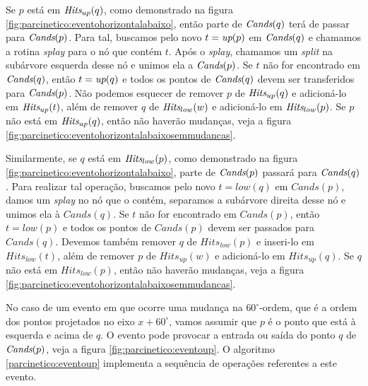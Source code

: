 

Se $p$ está em $\textit{Hits}_{up}(q)$, como demonstrado na figura
\ref{fig:parcinetico:eventohorizontalabaixo}, então parte de
$\textit{Cands}(q)$ terá de passar para $\textit{Cands}(p)$. Para tal, buscamos pelo
novo $t = \textit{up}(p)$ em $\textit{Cands}(q)$ e chamamos a rotina \textit{splay}
para o nó que contém $t$. Após o \textit{splay}, chamamos um
\textit{split} na subárvore esquerda desse nó e unimos ela a
$\textit{Cands}(p)$. Se $t$ não for encontrado em $\textit{Cands}(q)$, então $t =
\textit{up}(q)$ e todos os pontos de $\textit{Cands}(q)$ devem ser transferidos para
$\textit{Cands}(p)$. Não podemos esquecer de remover $p$ de $\textit{Hits}_{up}(q)$
e adicioná-lo em $\textit{Hits}_{up}(t)$, além de remover $q$ de
$\textit{Hits}_{low}(w)$ e adicioná-lo em $\textit{Hits}_{low}(p)$. Se $p$ não está
em $\textit{Hits}_{up}(q)$, então não haverão mudanças, veja a figura
\ref{fig:parcinetico:eventohorizontalabaixosemmudancas}.



Similarmente, se $q$ está em $\textit{Hits}_{low}(p)$, como demonstrado na
figura \ref{fig:parcinetico:eventohorizontalabaixo}, parte de
$\textit{Cands}(p)$ passará para $\textit{Cands}(q)$. Para realizar tal operação,
buscamos pelo novo $t = low(q)$ em $Cands(p)$, damos um
\textit{splay} no nó que o contém, separamos a subárvore direita
desse nó e unimos ela à $Cands(q)$. Se $t$ não for encontrado em
$Cands(p)$, então $t = low(p)$ e todos os pontos de $Cands(p)$ devem
ser passados para $Cands(q)$. Devemos também remover $q$ de
$Hits_{low}(p)$ e inseri-lo em $Hits_{low}(t)$, além de remover $p$
de $Hits_{up}(w)$ e adicioná-lo em $Hits_{up}(q)$. Se $q$ não está
em $Hits_{low}(p)$, então não haverão mudanças, veja a figura
\ref{fig:parcinetico:eventohorizontalabaixosemmudancas}.



No caso de um evento em que ocorre uma mudança na $60^\circ$-ordem,
que é a ordem dos pontos projetados no eixo $x + 60^\circ$, vamos
assumir que $p$ é o ponto que está à esquerda e acima de $q$. O
evento pode provocar a entrada ou saída do ponto $q$ de $\textit{Cands}(p)$,
veja a figura \ref{fig:parcinetico:eventoup}. O algoritmo
\ref{parcinetico:eventoup} implementa a sequência de operações
referentes a este evento.

